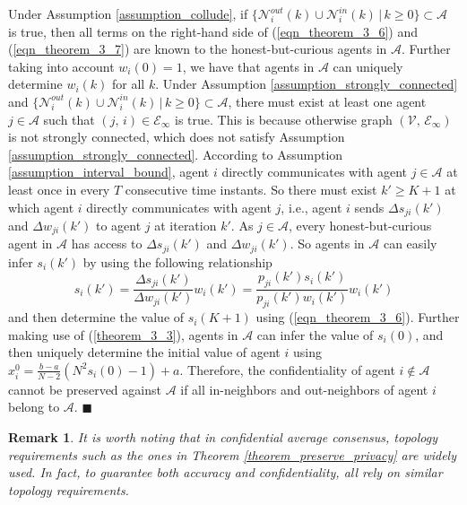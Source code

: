 \documentclass{IEEEtran}
\newtheorem{Remark}{Remark}
\begin{document}
Under Assumption \ref{assumption_collude}, if $\{\mathcal{N}_i^{out}(k)\cup \mathcal{N}_i^{in}(k) \, \big| \, k \geq 0 \} \subset \mathcal{A}$ is true, then all terms on the right-hand side of (\ref{eqn_theorem_3_6}) and (\ref{eqn_theorem_3_7}) are known to the honest-but-curious agents in $\mathcal{A}$. Further taking into account $w_i(0)=1$, we have that agents in $\mathcal{A}$ can uniquely determine $w_i(k)$ for all $k$. Under Assumption \ref{assumption_strongly_connected} and $\{\mathcal{N}_i^{out}(k)\cup \mathcal{N}_i^{in}(k) \, \big| \, k \geq 0 \} \subset \mathcal{A}$, there must exist at least one agent $j \in \mathcal{A}$ such that $(j, \, i) \in \mathcal{E}_{\infty}$ is true. This is because otherwise graph $(\mathcal{V}, \, \mathcal{E}_{\infty})$ is not strongly connected, which does not satisfy Assumption \ref{assumption_strongly_connected}. According to Assumption \ref{assumption_interval_bound}, agent $i$ directly communicates with agent $j\in \mathcal{A}$ at least once in every $T$ consecutive time instants. So there must exist $k' \geq K+1$ at which agent $i$ directly communicates with agent $j$, i.e., agent $i$ sends $\Delta s_{ji}(k')$ and $\Delta w_{ji}(k')$ to agent $j$ at iteration $k'$. As $j \in \mathcal{A}$, every honest-but-curious agent in $\mathcal{A}$ has access to $\Delta s_{ji}(k')$ and $\Delta w_{ji}(k')$. So agents in $\mathcal{A}$ can easily infer $s_i(k')$ by using the following relationship
\begin{equation}\label{agent_i_s_5_A}
	s_i(k') = \frac{\Delta s_{ji}(k')}{\Delta w_{ji}(k')} w_i(k') = \frac{p_{ji}(k')s_i(k')}{p_{ji}(k')w_i(k')} w_i(k')
\end{equation}
and then determine the value of $s_i(K+1)$ using (\ref{eqn_theorem_3_6}). Further making use of (\ref{theorem_3_3}), agents in $\mathcal{A}$ can infer the value of $s_i(0)$, and then uniquely determine the initial value of agent $i$ using $x_i^0=\frac{b-a}{N-2}(N^2s_i(0)-1)+a$. Therefore, the confidentiality of agent $i\notin \mathcal{A}$ cannot be preserved against $\mathcal{A}$ if all in-neighbors and out-neighbors of agent $i$ belong to $\mathcal{A}$. \hfill{$\blacksquare$}

\begin{Remark}\label{remark_topology_requirements}
	It is worth noting that in confidential average consensus, topology requirements such as the ones in Theorem \ref{theorem_preserve_privacy} are widely used. In fact, to guarantee both accuracy and confidentiality, \cite{manitara2013privacy, he2018privacy, mo2017privacy, charalambous2019privacy, gupta2019statistical, pilet2019robust, altafini2019dynamical, pequito2014design, ridgley2019simple, fang2018secure, ruan2019secure, wang2019privacy} all rely on similar topology requirements.
\end{Remark}
\end{document}
